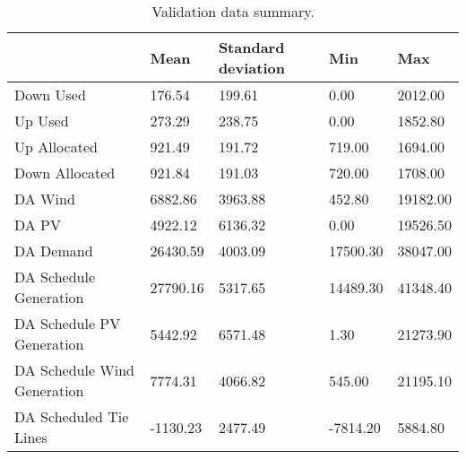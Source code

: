 \begin{table}[H] 
    \caption{Validation data summary. \label{validation_data_mean}}
    \begin{tabularx}{\textwidth}{CCCCC}
    \toprule
    & \textbf{Mean}	& \textbf{Standard deviation}	& \textbf{Min} & \textbf{Max}\\
    \midrule
    Down Used & 176.54 & 199.61 & 0.00 & 2012.00 \\
    Up Used & 273.29 & 238.75 & 0.00 & 1852.80 \\
    Up Allocated & 921.49 & 191.72 & 719.00 & 1694.00 \\
    Down Allocated & 921.84 & 191.03 & 720.00 & 1708.00 \\
    DA Wind & 6882.86 & 3963.88 & 452.80 & 19182.00 \\
    DA PV & 4922.12 & 6136.32 & 0.00 & 19526.50 \\
    DA Demand & 26430.59 & 4003.09 & 17500.30 & 38047.00 \\
    DA Schedule Generation & 27790.16 & 5317.65 & 14489.30 & 41348.40 \\
    DA Schedule PV Generation & 5442.92 & 6571.48 & 1.30 & 21273.90 \\
    DA Schedule Wind Generation & 7774.31 & 4066.82 & 545.00 & 21195.10 \\
    DA Scheduled Tie Lines & -1130.23 & 2477.49 & -7814.20 & 5884.80 \\
    \bottomrule
    \end{tabularx}
\end{table}

